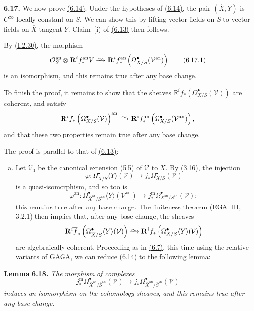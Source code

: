 \documentclass{report}
\newenvironment{itenv}[1]
  {\phantomsection\par\medskip\noindent\textbf{#1.}\itshape}
  {\par\medskip}
\newenvironment{rmenv}[1]
  {\phantomsection\par\medskip\noindent\textbf{#1.}\rmfamily}
  {\par\medskip}
\renewcommand{\cal}[1]{{\mathcal{#1}}}
\newcommand{\RR}{\mathbf{R}}
\newcommand{\an}{\mathrm{an}}
\newcommand{\mm}{\mathrm{m}}
\newcommand{\simto}{\xrightarrow{\raisebox{-0.7ex}[0ex][0ex]{$\sim$}}}
\newcommand{\oldpage}[1]{\marginpar{\footnotesize$\Big\vert$ \textit{p.~#1}}}
\begin{document}
\begin{rmenv}{6.17}
\label{II.6.17}
  We now prove \hyperref[II.6.14]{(6.14)}.
  Under the hypotheses of \hyperref[II.6.14]{(6.14)}, the pair $(\overline{X},Y)$ is $C^\infty$-locally constant on $S$.
  We can show this by lifting vector fields on $S$ to vector fields on $\overline{X}$ tangent $Y$.
  Claim~(i) of \hyperref[II.6.13]{(6.13)} then follows.

  By \hyperref[I.2.30]{(I.2.30)}, the morphism
  \[
  \label{II.6.17.1}
    \cal{O}_S^\an \otimes \RR^i f_*^\an V
    \simto \RR^i f_*^\an\left(\Omega_{X/S}^\bullet(\cal{V}^\an)\right)
  \tag{6.17.1}
  \]
  is an isomorphism, and this remains true after any base change.

  To finish the proof, it remains to show that the sheaves $\mathbb{R}^i f_*(\Omega_{X/S}^\bullet(\cal{V}))$ are coherent, and satisfy
  \[
    \RR^i f_*\left(\Omega_{X/S}^\bullet(\cal{V})\right)^\an
    \simto \RR^i f_*^\an\left(\Omega_{X/S}^\bullet(\cal{V}^\an)\right),
  \]
  and that these two properties remain true after any base change.

  The proof is parallel to that of \hyperref[II.6.13]{(6.13)}:
  \begin{enumerate}[(a)]
    \item Let $\cal{V}_0$ be the canonical extension \hyperref[II.5.5]{(5.5)} of $\cal{V}$ to $\overline{X}$.
      By \hyperref[II.3.16]{(3.16)}, the injection
      \[
        \varphi\colon \Omega_{\overline{X}/S}^\bullet\langle Y\rangle(\cal{V})
        \to j_*\Omega_{X/S}^\bullet(\cal{V})
      \]
      is a quasi-isomorphism, and so too is
      \[
        \varphi^\an\colon \Omega_{\overline{X}^\an/S^\an}^\bullet\langle Y\rangle(\cal{V}^\an)
        \to j_*^\mm\Omega_{X^\an/S^\an}^\bullet(\cal{V});
      \]
      this remains true after any base change.
      The finiteness theorem (EGA~III, 3.2.1) then implies that, after any base change, the sheaves
\oldpage{109}
      \[
        \RR^i \overline{f}_* \left(\Omega_{\overline{X}/S}^\bullet\langle Y\rangle(\cal{V})\right)
        \simto \RR^i f_*\left(\Omega_{X/S}^\bullet\langle Y\rangle(\cal{V})\right)
      \]
      are algebraically coherent.
      Proceeding as in \hyperref[II.6.7]{(6.7)}, this time using the relative variants of GAGA, we can reduce \hyperref[II.6.14]{(6.14)} to the following lemma:
  \end{enumerate}
\end{rmenv}

\begin{itenv}{Lemma 6.18}
\label{II.6.18}
  The morphism of complexes
  \[
    j_*^\mm\Omega_{\overline{X}^\an/\overline{S}^\an}^\bullet(\cal{V})
    \to j_*\Omega_{\overline{X}^\an/\overline{S}^\an}^\bullet(\cal{V})
  \]
  induces an isomorphism on the cohomology sheaves, and this remains true after any base change.
\end{itenv}
\end{document}
